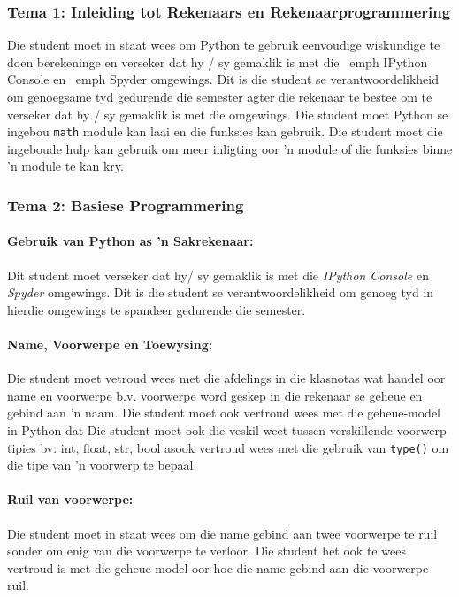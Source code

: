         \subsubsection{Tema 1: Inleiding tot Rekenaars en Rekenaarprogrammering}

	Die student moet in staat wees om Python te gebruik eenvoudige wiskundige te doen 
             berekeninge en verseker dat hy / sy gemaklik is met 
             die \ emph {IPython Console} en \ emph {Spyder} omgewings. Dit is die student se verantwoordelikheid om genoegsame tyd gedurende die semester agter die rekenaar te bestee om te verseker dat hy / sy gemaklik is
	met die omgewings. Die student moet Python se ingebou \texttt{math} module kan laai
            en die funksies kan gebruik. Die student moet die ingeboude hulp kan gebruik om meer inligting oor 
	'n module of die funksies binne 'n module te kan kry.
            
        \subsubsection{Tema 2: Basiese Programmering}
            \paragraph{Gebruik van Python as 'n Sakrekenaar:}
		 Dit student moet verseker dat hy/ sy gemaklik is met die 
		 \emph{IPython Console} en \emph{Spyder} omgewings.  Dit is die 
		 student se verantwoordelikheid om genoeg tyd in hierdie omgewings
		 te spandeer gedurende die semester.
       
	     \paragraph{Name, Voorwerpe en Toewysing:}
		 Die student moet vetroud wees met die afdelings in die klasnotas wat handel oor
		 name en voorwerpe b.v. voorwerpe word geskep in die rekenaar se geheue en 
		 gebind aan 'n naam.  Die student moet ook vertroud wees met die 
		 geheue-model in Python dat 
		 Die student moet ook die veskil weet
		 tussen verskillende voorwerp tipies bv. int, float, str, bool asook vertroud wees met 
		die gebruik van \texttt{type()} om die tipe van 'n voorwerp te bepaal.

	\paragraph{Ruil van voorwerpe:}
		Die student moet in staat wees om die name gebind aan twee voorwerpe te ruil sonder 
             	om enig van die voorwerpe te verloor. Die student het ook te wees 
            	 vertroud is met die geheue model oor hoe die name gebind
	          aan die voorwerpe ruil.
	
